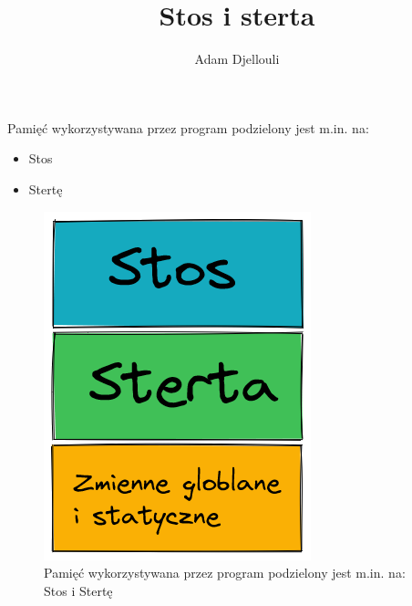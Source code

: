 \documentclass[notheorems, aspectratio=54]{beamer}
\title[Stos i sterta]{Stos i sterta}
\author{Adam Djellouli}
\begin{document}
\begin{frame}
	\titlepage
\end{frame}

\begin{frame}
	Pamięć wykorzystywana przez program podzielony jest m.in. na:
	
	\begin{itemize}
		\item Stos
		\item Stertę
	\end{itemize}
	
	\begin{figure}
		\includegraphics [width=\linewidth]{pamiec.png}
		\caption{Pamięć wykorzystywana przez program podzielony jest m.in. na: Stos i Stertę}
	\end{figure}
	
\end{frame}
\end{document}
